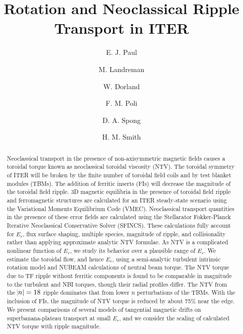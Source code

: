\documentclass[aip, pop, preprint]{revtex4-1}
\begin{document}
\title{Rotation and Neoclassical Ripple Transport in ITER}
\author{E. J. Paul}

\author{M. Landreman}

\author{W. Dorland}

\author{F. M. Poli}

\author{D. A. Spong}

\author{H. M. Smith}

\begin{abstract}

Neoclassical transport in the presence of non-axisymmetric magnetic fields causes a toroidal torque known as neoclassical toroidal viscosity (NTV). The toroidal symmetry of ITER will be broken by the finite number of toroidal field coils and by test blanket modules (TBMs). The addition of ferritic inserts (FIs) will decrease the magnitude of the toroidal field ripple. 3D magnetic equilibria in the presence of toroidal field ripple and ferromagnetic structures are calculated for an ITER steady-state scenario using the Variational Moments Equilibrium Code (VMEC). Neoclassical transport quantities in the presence of these error fields are calculated using the Stellarator Fokker-Planck Iterative Neoclassical Conservative Solver (SFINCS). These calculations fully account for $E_r$, flux surface shaping, multiple species, magnitude of ripple, and collisionality rather than applying approximate analytic NTV formulae. As NTV is a complicated nonlinear function of $E_r$, we study its behavior over a plausible range of $E_r$. We estimate the toroidal flow, and hence $E_r$, using a semi-analytic turbulent intrinsic rotation model and NUBEAM calculations of neutral beam torque. The NTV torque due to TF ripple without ferritic components is found to be comparable in magnitude to the turbulent and NBI torques, though their radial profiles differ. The NTV from the $\abs{n} = 18$ ripple dominates that from lower $n$ perturbations of the TBMs. With the inclusion of FIs, the magnitude of NTV torque is reduced by about 75\% near the edge. We present comparisons of several models of tangential magnetic drifts on superbanana-plateau transport at small $E_r$, and we consider the scaling of calculated NTV torque with ripple magnitude.
\end{abstract}
\end{document}
